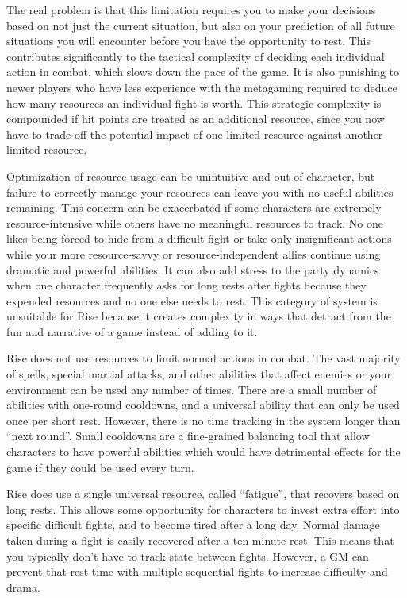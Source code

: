     The real problem is that this limitation requires you to make your decisions based on not just the current situation, but also on your prediction of all future situations you will encounter before you have the opportunity to rest.
    This contributes significantly to the tactical complexity of deciding each individual action in combat, which slows down the pace of the game.
    It is also punishing to newer players who have less experience with the metagaming required to deduce how many resources an individual fight is worth.
    This strategic complexity is compounded if hit points are treated as an additional resource, since you now have to trade off the potential impact of one limited resource against another limited resource.

    Optimization of resource usage can be unintuitive and out of character, but failure to correctly manage your resources can leave you with no useful abilities remaining.
    This concern can be exacerbated if some characters are extremely resource-intensive while others have no meaningful resources to track.
    No one likes being forced to hide from a difficult fight or take only insignificant actions while your more resource-savvy or resource-independent allies continue using dramatic and powerful abilities.
    It can also add stress to the party dynamics when one character frequently asks for long rests after fights because they expended resources and no one else needs to rest.
    This category of system is unsuitable for Rise because it creates complexity in ways that detract from the fun and narrative of a game instead of adding to it.

    Rise does not use resources to limit normal actions in combat.
    The vast majority of spells, special martial attacks, and other abilities that affect enemies or your environment can be used any number of times.
    There are a small number of abilities with one-round cooldowns, and a universal ability that can only be used once per short rest.
    However, there is no time tracking in the system longer than ``next round''.
    Small cooldowns are a fine-grained balancing tool that allow characters to have powerful abilities which would have detrimental effects for the game if they could be used every turn.

    Rise does use a single universal resource, called ``fatigue'', that recovers based on long rests.
    This allows some opportunity for characters to invest extra effort into specific difficult fights, and to become tired after a long day.
    Normal damage taken during a fight is easily recovered after a ten minute rest.
    This means that you typically don't have to track state between fights.
    However, a GM can prevent that rest time with multiple sequential fights to increase difficulty and drama.

